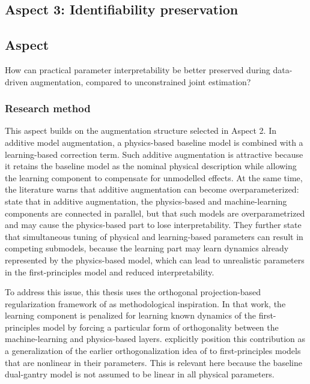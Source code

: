 \subsection{Aspect 3: Identifiability preservation}

\subsection*{Aspect}
How can practical parameter interpretability be better preserved during data-driven augmentation, compared to unconstrained joint estimation?

\subsubsection{Research method}

This aspect builds on the augmentation structure selected in Aspect 2. In additive model augmentation, a physics-based baseline model is combined with a learning-based correction term. Such additive augmentation is attractive because it retains the baseline model as the nominal physical description while allowing the learning component to compensate for unmodelled effects. At the same time, the literature warns that additive augmentation can become overparameterized: \citet{gyorok2025orthogonal} state that in additive augmentation, the physics-based and machine-learning components are connected in parallel, but that such models are overparametrized and may cause the physics-based part to lose interpretability. They further state that simultaneous tuning of physical and learning-based parameters can result in competing submodels, because the learning part may learn dynamics already represented by the physics-based model, which can lead to unrealistic parameters in the first-principles model and reduced interpretability.

To address this issue, this thesis uses the orthogonal projection-based regularization framework of \citet{gyorok2025orthogonal} as methodological inspiration. In that work, the learning component is penalized for learning known dynamics of the first-principles model by forcing a particular form of orthogonality between the machine-learning and physics-based layers. \citet{gyorok2025orthogonal} explicitly position this contribution as a generalization of the earlier orthogonalization idea of \citet{kon2022orthogonal} to first-principles models that are nonlinear in their parameters. This is relevant here because the baseline dual-gantry model is not assumed to be linear in all physical parameters.

